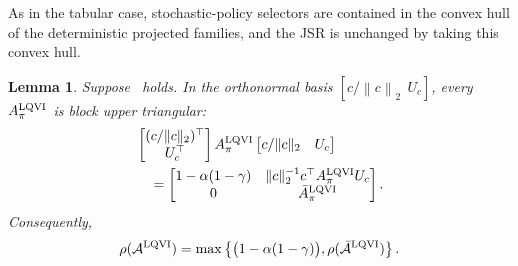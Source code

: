 \documentclass[letterpaper]{article}
\numberwithin{equation}{section}
\newtheorem{lemma}{Lemma}[section]
\begin{document}
As in the tabular case, stochastic-policy selectors are contained in the convex
hull of the deterministic projected families, and the JSR is unchanged by taking
this convex hull.

\begin{lemma}
\label{lem:linear-fa-standard-jsr-decomposition}
Suppose~ holds. In the orthonormal basis
$[c/\left\lVert c \right\rVert_2\ \ U_c]$, every $A_\pi^{\rm LQVI}$ is block upper triangular:
\begin{equation}
\begin{aligned}
&\begin{bmatrix}
    (c/\|c\|_2)^\top\\
    U_c^\top
  \end{bmatrix}
  A_\pi^{\rm LQVI}
  \begin{bmatrix}
    c/\|c\|_2&U_c
  \end{bmatrix}\\
&\quad=
  \begin{bmatrix}
    1-\alpha(1-\gamma)&\|c\|_2^{-1}c^\top A_\pi^{\rm LQVI}U_c\\
    0&\bar A_\pi^{\rm LQVI}
  \end{bmatrix}.
\end{aligned}
\label{eq:linear-fa-standard-coordinate-block}
\end{equation}
Consequently,
\begin{align*}
  \rho(\mathcal A^{\rm LQVI})
  =\max\left\{\bigl(1-\alpha(1-\gamma)\bigr),\rho(\bar{\mathcal A}^{\rm LQVI})\right\}.
\end{align*}
\end{lemma}
\end{document}

